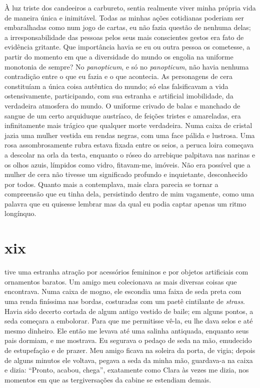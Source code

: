À luz triste dos candeeiros a carbureto, sentia realmente viver minha própria
vida de maneira única e inimitável. Todas as minhas ações cotidianas poderiam
ser embaralhadas como num jogo de cartas, eu não fazia questão de nenhuma
delas; a irresponsabilidade das pessoas pelos seus mais conscientes gestos
era fato de evidência gritante. Que importância havia se eu ou outra pessoa
os cometesse, a partir do momento em que a diversidade do mundo os engolia na
uniforme monotonia de sempre? No \textit{panopticum}, e só no \textit
{panopticum}, não havia nenhuma contradição entre o que eu fazia e o que
acontecia. As personagens de cera constituíam a única coisa autêntica do
mundo; só elas falsificavam a vida ostensivamente, participando, com sua
estranha e artificial imobilidade, da verdadeira atmosfera do mundo. O
uniforme crivado de balas e manchado de sangue de um certo arquiduque
austríaco, de feições tristes e amareladas, era infinitamente mais trágico
que qualquer morte verdadeira. Numa caixa de cristal jazia uma mulher vestida
em rendas negras, com uma face pálida e lustrosa. Uma rosa assombrosamente
rubra estava fixada entre os seios, a peruca loira começava a descolar na
orla da testa, enquanto o róseo do arrebique palpitava nas narinas e os olhos
azuis, límpidos como vidro, fitavam-me, imóveis. Não era possível que a
mulher de cera não tivesse um significado profundo e inquietante,
desconhecido por todos. Quanto mais a contemplava, mais clara parecia se
tornar a compreensão que eu tinha dela, persistindo dentro de mim vagamente,
como uma palavra que eu quisesse lembrar mas da qual eu podia captar apenas
um ritmo longínquo.


\section{xix} 

 tive uma estranha atração por acessórios femininos e por
 objetos artificiais com ornamentos baratos. Um amigo meu colecionava as mais
 diversas coisas que encontrava. Numa caixa de mogno, ele escondia uma faixa
 de seda preta com uma renda finíssima nas bordas, costuradas com um paetê
 cintilante de \textit{strass}. Havia sido decerto cortada de algum antigo
 vestido de baile; em alguns pontos, a seda começara a embolorar. Para que me
 permitisse vê-la, eu lhe dava selos e até mesmo dinheiro. Ele então me
 levava até uma salinha antiquada, enquanto seus pais dormiam, e me mostrava.
 Eu segurava o pedaço de seda na mão, emudecido de estupefação e de prazer.
 Meu amigo ficava na soleira da porta, de vigia; depois de alguns minutos ele
 voltava, pegava a seda da minha mão, guardava-a na caixa e dizia: ``Pronto,
 acabou, chega'', exatamente como Clara às vezes me dizia, nos momentos em
 que as tergiversações da cabine se estendiam demais.

